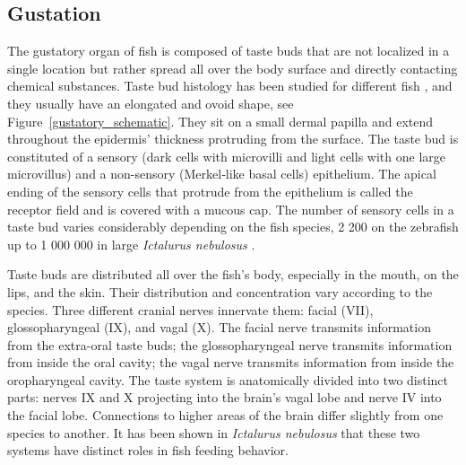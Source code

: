     \subsection{Gustation}
    The gustatory organ of fish is composed of taste buds that are not localized in a single location but rather spread all over the body surface and directly contacting chemical substances. Taste bud histology has been studied for different fish \cite{kapoor1976gustatory,fishelson2004taste,reutter2000heterogeneity,reutter1991ultrastructure,reutter2012taste}, and they usually have an elongated and ovoid shape, see Figure~\ref{gustatory_schematic}. They sit on a small dermal papilla and extend throughout the epidermis' thickness protruding from the surface. The taste bud is constituted of a sensory (dark cells with microvilli and light cells with one large microvillus) and a non-sensory (Merkel‐like basal cells) epithelium. The apical ending of the sensory cells that protrude from the epithelium is called the receptor field and is covered with a mucous cap. The number of sensory cells in a taste bud varies considerably depending on the fish species, 2 200 on the zebrafish up to 1 000 000 in large \textit{Ictalurus nebulosus} \cite{kasumyan2019taste}.

    Taste buds are distributed all over the fish's body, especially in the mouth, on the lips, and the skin. Their distribution and concentration vary according to the species. Three different cranial nerves innervate them: facial (VII), glossopharyngeal (IX), and vagal (X). The facial nerve transmits information from the extra-oral taste buds; the glossopharyngeal nerve transmits information from inside the oral cavity; the vagal nerve transmits information from inside the oropharyngeal cavity. The taste system is anatomically divided into two distinct parts: nerves IX and X projecting into the brain's vagal lobe and nerve IV into the facial lobe. Connections to higher areas of the brain differ slightly from one species to another. It has been shown in \textit{Ictalurus nebulosus} \cite{atema1971structures} that these two systems have distinct roles in fish feeding behavior.

